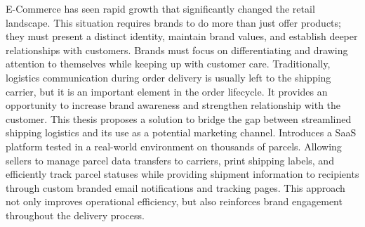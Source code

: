 E-Commerce has seen rapid growth that significantly changed the retail landscape.
This situation requires brands to do more than just offer products; they must present
a distinct identity, maintain brand values, and establish deeper relationships with customers. 
Brands must focus on differentiating and drawing attention to themselves while keeping up with customer care.
Traditionally, logistics communication during order delivery is usually left to the shipping carrier, but it is an important element in the order lifecycle.
It provides an opportunity to increase brand awareness and strengthen relationship with the customer.
This thesis proposes a solution to bridge the gap between streamlined shipping logistics and its use as a potential marketing channel. 
Introduces a SaaS platform tested in a real-world environment on thousands of parcels. 
Allowing sellers to manage parcel data transfers to carriers, print shipping labels, and efficiently track parcel statuses while providing shipment information to recipients through custom branded email notifications and tracking pages.
This approach not only improves operational efficiency, but also reinforces brand engagement throughout the delivery process.
